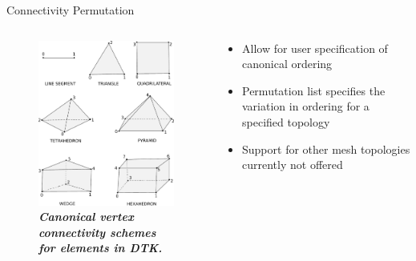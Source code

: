 \documentclass{beamer}
\begin{document}
\begin{frame}{Connectivity Permutation}

  \begin{columns}
    
    \begin{column}{0.5\textwidth}
      \begin{figure}[htpb!]
        \centering
        \includegraphics[width=2.2in]{Linear_Elements.pdf}
        \caption{\bf \sl Canonical vertex connectivity schemes for elements
          in DTK.}
        \label{fig:linear_elements}
      \end{figure}
    \end{column}

    \begin{column}{0.5\textwidth}
      \begin{itemize}
        \item Allow for user specification of canonical ordering
          \medskip
        \item Permutation list specifies the variation in ordering for
          a specified topology
          \medskip
        \item Support for other mesh topologies currently not offered
      \end{itemize}
    \end{column}

  \end{columns}


\end{frame}
\end{document}
